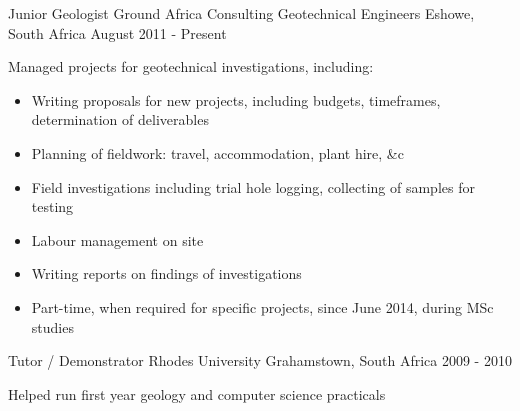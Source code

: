 \begin{cventries}
\cventry
{Junior Geologist} %
{Ground Africa Consulting Geotechnical Engineers} %
{Eshowe, South Africa} %
{August 2011 - Present} %
{ %
\begin{cvitems}
\item {Managed projects for geotechnical investigations, including:
\begin{itemize}
\item {Writing proposals for new projects, including budgets, timeframes, determination of deliverables}
\item {Planning of fieldwork: travel, accommodation, plant hire, \&c}
\item {Field investigations including trial hole logging, collecting of samples for testing}
\item {Labour management on site}
\item {Writing reports on findings of investigations}
\item {Part-time, when required for specific projects, since June 2014, during MSc studies}
\end{itemize}
}
\end{cvitems}
}


\cventry
{Tutor / Demonstrator} %
{Rhodes University} %
{Grahamstown, South Africa} %
{2009 - 2010} %
{ %
\begin{cvitems}
\item {Helped run first year geology and computer science practicals}
\end{cvitems}
}


\end{cventries}